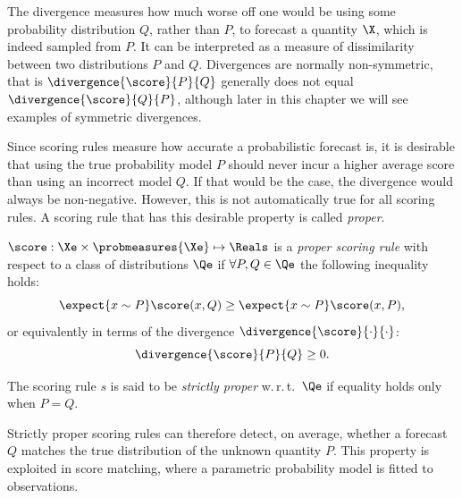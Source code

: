 The divergence measures how much worse off one would be using some probability distribution $Q$, rather than $P$, to forecast a quantity $\X$, which is indeed sampled from $P$. It can be interpreted as a measure of dissimilarity between two distributions $P$ and $Q$. Divergences are normally non-symmetric, that is $\divergence{\score}{P}{Q}$ generally does not equal $\divergence{\score}{Q}{P}$, although later in this chapter we will see examples of symmetric divergences.

Since scoring rules measure how accurate a probabilistic forecast is, it is desirable that using the true probability model $P$ should never incur a higher average score than using an incorrect model $Q$. If that would be the case, the divergence would always be non-negative. However, this is not automatically true for all scoring rules. A scoring rule that has this desirable property is called \emph{proper}.

\begin{definition}\label{def:strictly_proper}
	$\score:\Xe\times\probmeasures{\Xe}\mapsto\Reals$ is a \emph{proper scoring rule} with respect to a class of distributions $\Qe$ if $\forall P,Q\in\Qe$ the following inequality holds:
	\begin{equation}
		\expect{x\sim P} \score(x,Q) \geq \expect{x\sim P} \score(x,P),
	\end{equation}
	or equivalently in terms of the divergence $\divergence{\score}{\cdot}{\cdot}$:
	\begin{equation}
		\divergence{\score}{P}{Q} \geq 0.
	\end{equation}
	
	The scoring rule $s$ is said to be \emph{strictly proper} w.\,r.\,t.\ $\Qe$ if equality holds only when $P=Q$.
\end{definition}

Strictly proper scoring rules can therefore detect, on average, whether a forecast $Q$ matches the true distribution of the unknown quantity $P$. This property is exploited in score matching, where a parametric probability model is fitted to \iid observations.

